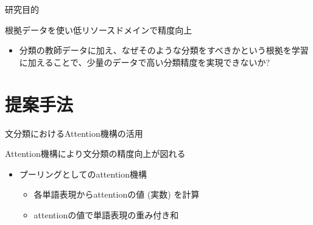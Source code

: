 \begin{frame}{研究目的}
\begin{lead}
    根拠データを使い低リソースドメインで精度向上
\end{lead}
\begin{itemize}
\item 分類の教師データに加え、なぜそのような分類をすべきかという\alert{根拠を学習に加える}ことで、\alert{少量のデータで高い分類精度}を実現できないか?
\end{itemize}
\end{frame}

\section{提案手法}
\frame[standout]{\insertsection}

\begin{frame}{文分類におけるAttention機構の活用}
\begin{lead}
    Attention機構により文分類の精度向上が図れる
\end{lead}
\begin{itemize}
\item プーリングとしてのattention機構
\begin{itemize}
    \item 各単語表現からattentionの値 (実数) を計算
    \item attentionの値で単語表現の重み付き和
\end{itemize}
\end{itemize}


\end{frame}
